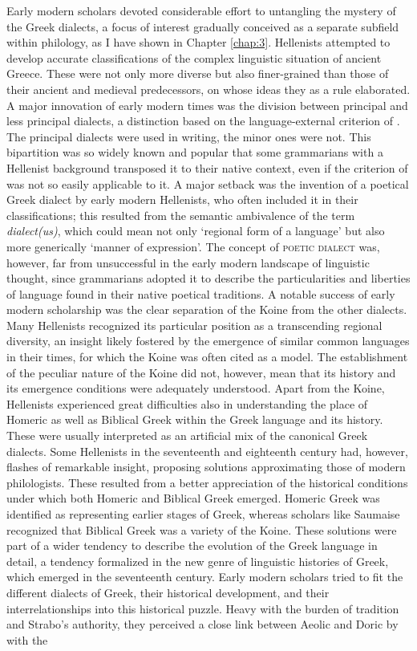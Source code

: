 Early modern scholars devoted considerable effort to untangling the mystery of the Greek dialects, a focus of interest gradually conceived as a separate subfield within philology, as I have shown in Chapter \ref{chap:3}. Hellenists attempted to develop accurate classifications of the complex linguistic situation of ancient Greece. These were not only more diverse but also finer-grained than those of their ancient and medieval predecessors, on whose ideas they as a rule elaborated. A major innovation of early modern times was the division between principal and less principal dialects, a distinction based on the language-external criterion of . The principal dialects were used in writing, the minor ones were not. This bipartition was so widely known and popular that some  grammarians with a Hellenist background transposed it to their native context, even if the criterion of  was not so easily applicable to it. A major setback was the invention of a poetical Greek dialect by early modern Hellenists, who often included it in their classifications; this resulted from the semantic ambivalence of the term \textit{dialect(us)}, which could mean not only ‘regional form of a language’ but also more generically ‘manner of expression’. The concept of \textsc{poetic} \textsc{dialect} was, however, far from unsuccessful in the early modern landscape of linguistic thought, since  grammarians adopted it to describe the particularities and liberties of language found in their native poetical traditions. A notable success of early modern scholarship was the clear separation of the Koine from the other dialects. Many Hellenists recognized its particular position as a  transcending regional diversity, an insight likely fostered by the emergence of similar common languages in their times, for which the Koine was often cited as a model. The establishment of the peculiar nature of the Koine did not, however, mean that its history and its emergence conditions were adequately understood. Apart from the Koine, Hellenists experienced great difficulties also in understanding the place of Homeric as well as Biblical Greek within the Greek language and its history. These were usually interpreted as an artificial mix of the canonical Greek dialects. Some Hellenists in the seventeenth and eighteenth century had, however, flashes of remarkable insight, proposing solutions approximating those of modern philologists. These resulted from a better appreciation of the historical conditions under which both Homeric and Biblical Greek emerged. Homeric Greek was identified as representing earlier stages of Greek, whereas scholars like Saumaise recognized that Biblical Greek was a  variety of the Koine. These solutions were part of a wider tendency to describe the evolution of the Greek language in detail, a tendency formalized in the new genre of linguistic histories of Greek, which emerged in the seventeenth century. Early modern scholars tried to fit the different dialects of Greek, their historical development, and their interrelationships into this historical puzzle. Heavy with the burden of tradition and Strabo’s authority, they perceived a close link between Aeolic and Doric by  with the 